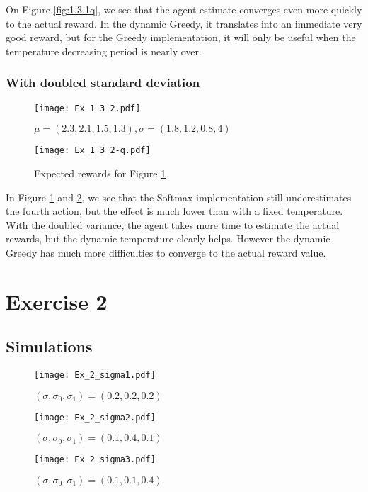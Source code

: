 \documentclass[a4paper,11pt]{article}
\begin{document}
On Figure \ref{fig:1.3.1q}, we see that the agent estimate converges even more quickly to the actual reward. In the dynamic Greedy, it translates into an immediate very good reward, but for the Greedy implementation, it will only be useful when the temperature decreasing period is nearly over.

\subsubsection{With doubled standard deviation}
\begin{figure}[H]
  \center
  \texttt{[image: Ex\_1\_3\_2.pdf]}
  \caption{\label{fig:1.3.2} $\mu = (2.3, 2.1, 1.5, 1.3), \sigma = (1.8, 1.2, 0.8, 4)$}
\end{figure}

\begin{figure}[H]
  \center
  \texttt{[image: Ex\_1\_3\_2-q.pdf]}
  \caption{\label{fig:1.3.2q} Expected rewards for Figure \ref{fig:1.3.2}}
\end{figure}

In Figure \ref{fig:1.3.2} and \ref{fig:1.3.2q}, we see that the Softmax implementation still underestimates the fourth action, but the effect is much lower than with a fixed temperature. With the doubled variance, the agent takes more time to estimate the actual rewards, but the dynamic temperature clearly helps. However the dynamic Greedy has much more difficulties to converge to the actual reward value.

\section{Exercise 2}
\subsection{Simulations}
\begin{figure}[H]
  \center
  \texttt{[image: Ex\_2\_sigma1.pdf]}
  \caption{\label{fig:2.1} $(\sigma, \sigma_{0}, \sigma_{1}) = (0.2, 0.2, 0.2)$}
\end{figure}

\begin{figure}[H]
  \center
  \texttt{[image: Ex\_2\_sigma2.pdf]}
  \caption{\label{fig:2.2} $(\sigma, \sigma_{0}, \sigma_{1}) = (0.1, 0.4, 0.1)$}
\end{figure}

\begin{figure}[H]
  \center
  \texttt{[image: Ex\_2\_sigma3.pdf]}
  \caption{\label{fig:2.3} $(\sigma, \sigma_{0}, \sigma_{1}) = (0.1, 0.1, 0.4)$}
\end{figure}

\subsection{}


\end{document}

